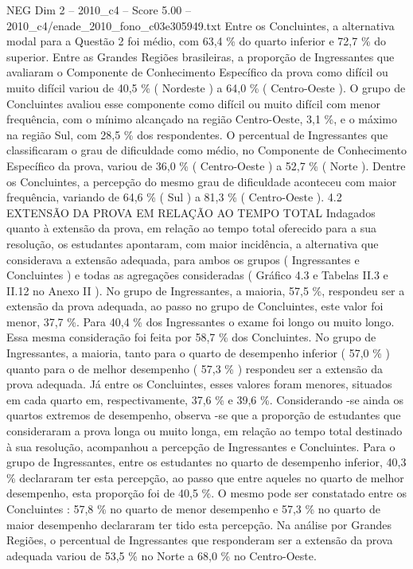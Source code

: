 \begin{textsample}{NEG Dim 2 – 2010\_c4 – Score 5.00 – 2010\_c4/enade\_2010\_fono\_c03e305949.txt}
Entre os Concluintes, a alternativa modal para a Questão 2 foi médio, com 63,4 \% do quarto inferior e 72,7 \% do superior.
Entre as Grandes Regiões brasileiras, a proporção de Ingressantes que avaliaram o Componente de Conhecimento Específico da prova como difícil ou muito difícil variou de 40,5 \% ( Nordeste ) a 64,0 \% ( Centro-Oeste ).
O grupo de Concluintes avaliou esse componente como difícil ou muito difícil com menor frequência, com o mínimo alcançado na região Centro-Oeste, 3,1 \%, e o máximo na região Sul, com 28,5 \% dos respondentes.
O percentual de Ingressantes que classificaram o grau de dificuldade como médio, no Componente de Conhecimento Específico da prova, variou de 36,0 \% ( Centro-Oeste ) a 52,7 \% ( Norte ).
Dentre os Concluintes, a percepção do mesmo grau de dificuldade aconteceu com maior frequência, variando de 64,6 \% ( Sul ) a 81,3 \% ( Centro-Oeste ). 4.2 EXTENSÃO DA PROVA EM RELAÇÃO AO TEMPO TOTAL Indagados quanto à extensão da prova, em relação ao tempo total oferecido para a sua resolução, os estudantes apontaram, com maior incidência, a alternativa que considerava a extensão adequada, para ambos os grupos ( Ingressantes e Concluintes ) e todas as agregações consideradas ( Gráfico 4.3 e Tabelas II.3 e II.12 no Anexo II ).
No grupo de Ingressantes, a maioria, 57,5 \%, respondeu ser a extensão da prova adequada, ao passo no grupo de Concluintes, este valor foi menor, 37,7 \%.
Para 40,4 \% dos Ingressantes o exame foi longo ou muito longo.
Essa mesma consideração foi feita por 58,7 \% dos Concluintes.
No grupo de Ingressantes, a maioria, tanto para o quarto de desempenho inferior ( 57,0 \% ) quanto para o de melhor desempenho ( 57,3 \% ) respondeu ser a extensão da prova adequada.
Já entre os Concluintes, esses valores foram menores, situados em cada quarto em, respectivamente, 37,6 \% e 39,6 \%.
Considerando -se ainda os quartos extremos de desempenho, observa -se que a proporção de estudantes que consideraram a prova longa ou muito longa, em relação ao tempo total destinado à sua resolução, acompanhou a percepção de Ingressantes e Concluintes.
Para o grupo de Ingressantes, entre os estudantes no quarto de desempenho inferior, 40,3 \% declararam ter esta percepção, ao passo que entre aqueles no quarto de melhor desempenho, esta proporção foi de 40,5 \%.
O mesmo pode ser constatado entre os Concluintes : 57,8 \% no quarto de menor desempenho e 57,3 \% no quarto de maior desempenho declararam ter tido esta percepção.
Na análise por Grandes Regiões, o percentual de Ingressantes que responderam ser a extensão da prova adequada variou de 53,5 \% no Norte a 68,0 \% no Centro-Oeste.

\end{textsample}
